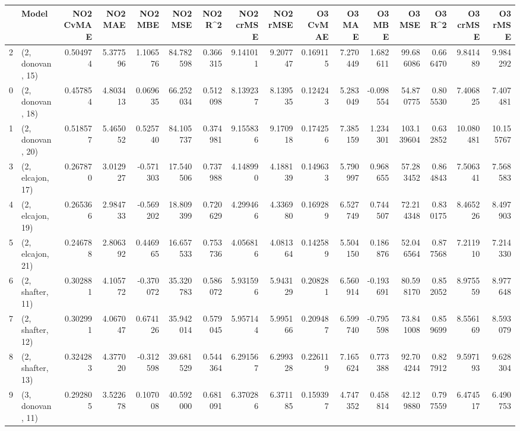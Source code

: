 \begin{tabular}{llrrrrrrrrrrrrrr}
\toprule
{} &             Model &  NO2 CvMAE &   NO2 MAE &   NO2 MBE &    NO2 MSE &   NO2 R\textasciicircum2 &  NO2 crMSE &  NO2 rMSE &  O3 CvMAE &     O3 MAE &    O3 MBE &      O3 MSE &    O3 R\textasciicircum2 &   O3 crMSE &    O3 rMSE \\
\midrule
2  &  (2, donovan, 15) &   0.504974 &  5.377596 &  1.106576 &  84.782598 &  0.366315 &   9.141011 &  9.207747 &  0.169115 &   7.270449 &  1.682611 &   99.686086 &  0.666470 &   9.841489 &   9.984292 \\
0  &  (2, donovan, 18) &   0.457854 &  4.803413 &  0.069635 &  66.252034 &  0.512098 &   8.139237 &  8.139535 &  0.124243 &   5.283049 & -0.098554 &   54.870775 &  0.805530 &   7.406825 &   7.407481 \\
1  &  (2, donovan, 20) &   0.518577 &  5.465052 &  0.525740 &  84.105737 &  0.374981 &   9.155836 &  9.170918 &  0.174256 &   7.385159 &  1.234301 &  103.139604 &  0.632852 &  10.080481 &  10.155767 \\
3  &  (2, elcajon, 17) &   0.267870 &  3.012927 & -0.571303 &  17.540506 &  0.737988 &   4.148990 &  4.188139 &  0.149633 &   5.790997 &  0.968655 &   57.283452 &  0.864843 &   7.506341 &   7.568583 \\
4  &  (2, elcajon, 19) &   0.265366 &  2.984733 & -0.569202 &  18.809399 &  0.720629 &   4.299466 &  4.336980 &  0.169289 &   6.527749 &  0.744507 &   72.214348 &  0.830175 &   8.465226 &   8.497903 \\
5  &  (2, elcajon, 21) &   0.246788 &  2.806392 &  0.446965 &  16.657533 &  0.753736 &   4.056816 &  4.081364 &  0.142589 &   5.504150 &  0.186876 &   52.046564 &  0.877568 &   7.211910 &   7.214330 \\
6  &  (2, shafter, 11) &   0.302881 &  4.105772 & -0.370072 &  35.320783 &  0.586072 &   5.931596 &  5.943129 &  0.208281 &   6.560914 & -0.193691 &   80.598170 &  0.852052 &   8.975559 &   8.977648 \\
7  &  (2, shafter, 12) &   0.302991 &  4.067047 &  0.674126 &  35.942014 &  0.579045 &   5.957144 &  5.995166 &  0.209487 &   6.599740 & -0.795598 &   73.841008 &  0.859699 &   8.556169 &   8.593079 \\
8  &  (2, shafter, 13) &   0.324283 &  4.377020 & -0.312598 &  39.681529 &  0.544364 &   6.291567 &  6.299328 &  0.226119 &   7.165624 &  0.773388 &   92.704244 &  0.827912 &   9.597193 &   9.628304 \\
9  &  (3, donovan, 11) &   0.292805 &  3.522678 &  0.107008 &  40.592000 &  0.681091 &   6.370286 &  6.371185 &  0.159397 &   4.747352 &  0.458814 &   42.129880 &  0.797559 &   6.474517 &   6.490753 \\

\end{tabular}
